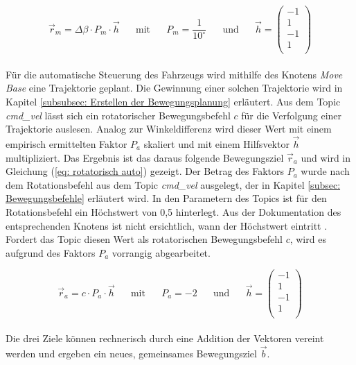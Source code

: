 		\begin{equation}
		\vec{r}_m = \Delta \beta \cdot P_{m} \cdot \vec{h}
		\text{ }
		\text{ }
		\text{ mit }
		\text{ }
		\text{ }
		P_m = \frac{1}{10^\circ} 
		\text{ }
		\text{ }
		\text{ und }
		\text{ }
		\text{ }
		\vec{h} = \left(
		\begin{array}{r}
		-1\\
		1\\
		-1\\
		1\\
		\end{array}\right)
		\label{eq: rotatorisch manuell}
		\end{equation}\\
		Für die automatische Steuerung des Fahrzeugs wird mithilfe des Knotens \textit{Move Base} eine Trajektorie geplant. Die Gewinnung einer solchen Trajektorie wird in Kapitel \ref{subsubsec: Erstellen der Bewegungsplanung} erläutert. Aus dem Topic \textit{cmd\_vel} lässt sich ein rotatorischer Bewegungsbefehl $c$ für die Verfolgung einer Trajektorie auslesen. Analog zur Winkeldifferenz wird dieser Wert mit einem empirisch ermittelten Faktor $P_{a}$ skaliert und mit einem Hilfsvektor $\vec{h}$ multipliziert. Das Ergebnis ist das daraus folgende Bewegungsziel $\vec{r}_{a}$ und wird in Gleichung (\ref{eq: rotatorisch auto}) gezeigt. Der Betrag des Faktors $P_a$ wurde nach dem Rotationsbefehl aus dem Topic \textit{cmd\_vel} ausgelegt, der in Kapitel \ref{subsec: Bewegungsbefehle} erläutert wird. In den Parametern des Topics ist für den Rotationsbefehl ein Höchstwert von 0,5 hinterlegt. Aus der Dokumentation des entsprechenden Knotens ist nicht ersichtlich, wann der Höchstwert eintritt \cite{teblp}. Fordert das Topic diesen Wert als rotatorischen Bewegungsbefehl $c$, wird es aufgrund des Faktors $P_a$ vorrangig abgearbeitet. 
						
		\begin{equation}
		\vec{r}_a = c \cdot P_{a} \cdot \vec{h}
		\text{ }
		\text{ }
		\text{ mit }
		\text{ }
		\text{ }
		P_a = -2 
		\text{ }
		\text{ }
		\text{ und }
		\text{ }
		\text{ }
		\vec{h} = \left(
		\begin{array}{rr}
		-1\\
		1\\
		-1\\
		1\\
		\end{array}\right)
		\label{eq: rotatorisch auto}
		\end{equation}\\
		Die drei Ziele können rechnerisch durch eine Addition der Vektoren vereint werden und ergeben ein neues, gemeinsames Bewegungsziel $\vec{b}$. 
		
